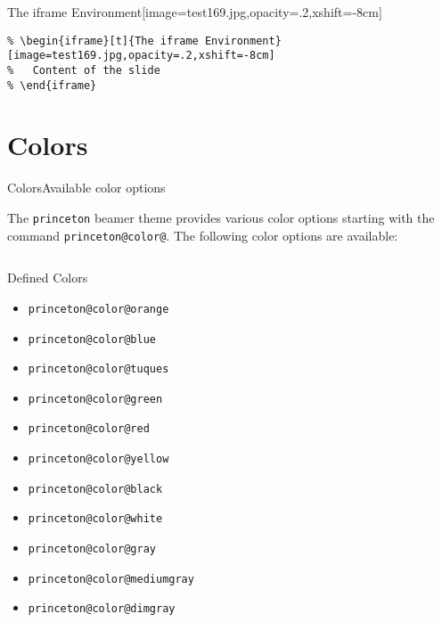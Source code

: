 \documentclass[aspectratio=169]{beamer}
\begin{document}
\begin{iframe}[t]{The iframe Environment}[image=test169.jpg,opacity=.2,xshift=-8cm]
  \begin{example}
    \begin{lstlisting}
% \begin{iframe}[t]{The iframe Environment}[image=test169.jpg,opacity=.2,xshift=-8cm]
%   Content of the slide
% \end{iframe}
    \end{lstlisting}
  \end{example}
\end{iframe}


\section{Colors}
\begin{frame}[t]{Colors}{Available color options}

  The \texttt{princeton} beamer theme provides various color options starting with the command \texttt{princeton@color@}. The following color options are available:

  \begin{columns}[T]
    \begin{column}{.5\textwidth}
      \begin{block}{Defined Colors}
        \begin{itemize}
        \item \textcolor{princeton@color@orange}{\texttt{princeton@color@orange}}
        \item \textcolor{princeton@color@blue}{\texttt{princeton@color@blue}}
        \item \textcolor{princeton@color@tuques}{\texttt{princeton@color@tuques}}
        \item \textcolor{princeton@color@green}{\texttt{princeton@color@green}}
        \item \textcolor{princeton@color@red}{\texttt{princeton@color@red}}
        \item \textcolor{princeton@color@yellow}{\texttt{princeton@color@yellow}}
        \item \textcolor{princeton@color@black}{\texttt{princeton@color@black}}
        \item \textcolor{princeton@color@white}{\texttt{princeton@color@white}}
        \item \textcolor{princeton@color@gray}{\texttt{princeton@color@gray}}
        \item \textcolor{princeton@color@mediumgray}{\texttt{princeton@color@mediumgray}}
        \item \textcolor{princeton@color@dimgray}{\texttt{princeton@color@dimgray}}
        \end{itemize}
      \end{block}
    \end{column}


\end{columns}
\end{frame}
\end{document}
